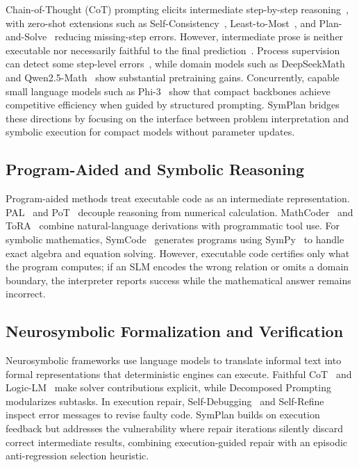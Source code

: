 \documentclass[runningheads]{llncs}
\begin{document}
Chain-of-Thought (CoT) prompting elicits intermediate step-by-step reasoning~\cite{wei2022cot}, with zero-shot extensions such as Self-Consistency~\cite{wang2023selfconsistency}, Least-to-Most~\cite{zhou2023leasttomost}, and Plan-and-Solve~\cite{wang2023plan} reducing missing-step errors. However, intermediate prose is neither executable nor necessarily faithful to the final prediction~\cite{lyu2023faithful}. Process supervision can detect some step-level errors~\cite{lightman2024verify}, while domain models such as DeepSeekMath~\cite{shao2024deepseekmath} and Qwen2.5-Math~\cite{yang2024qwen25math} show substantial pretraining gains. Concurrently, capable small language models such as Phi-3~\cite{abdin2024phi3} show that compact backbones achieve competitive efficiency when guided by structured prompting. SymPlan bridges these directions by focusing on the interface between problem interpretation and symbolic execution for compact models without parameter updates.

\subsection{Program-Aided and Symbolic Reasoning}

Program-aided methods treat executable code as an intermediate representation. PAL~\cite{gao2023pal} and PoT~\cite{chen2022pot} decouple reasoning from numerical calculation. MathCoder~\cite{wang2024mathcoder} and ToRA~\cite{gou2024tora} combine natural-language derivations with programmatic tool use. For symbolic mathematics, SymCode~\cite{nezhad2025symcode} generates programs using SymPy~\cite{meurer2017sympy} to handle exact algebra and equation solving. However, executable code certifies only what the program computes; if an SLM encodes the wrong relation or omits a domain boundary, the interpreter reports success while the mathematical answer remains incorrect.

\subsection{Neurosymbolic Formalization and Verification}

Neurosymbolic frameworks use language models to translate informal text into formal representations that deterministic engines can execute. Faithful CoT~\cite{lyu2023faithful} and Logic-LM~\cite{pan2023logiclm} make solver contributions explicit, while Decomposed Prompting~\cite{khot2023decomposed} modularizes subtasks. In execution repair, Self-Debugging~\cite{chen2024selfdebug} and Self-Refine~\cite{madaan2023selfrefine} inspect error messages to revise faulty code. SymPlan builds on execution feedback but addresses the vulnerability where repair iterations silently discard correct intermediate results, combining execution-guided repair with an episodic anti-regression selection heuristic.
\end{document}
